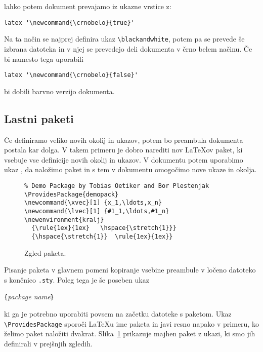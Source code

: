 lahko potem dokument prevajamo iz ukazne vrstice z:
\begin{verbatim}
latex '\newcommand{\crnobelo}{true}'
\end{verbatim}

Na ta način se najprej definira ukaz \verb|\blackandwhite|, potem pa 
se prevede še izbrana datoteka in v njej se prevedejo deli dokumenta v
črno belem načinu. Če bi namesto tega uporabili 
\begin{verbatim}
latex '\newcommand{\crnobelo}{false}'
\end{verbatim}
bi dobili barvno verzijo dokumenta.

\subsection{Lastni paketi}

Če definiramo veliko novih okolij in ukazov, potem bo preambula dokumenta 
postala kar dolga. V takem primeru je dobro narediti  nov 
\LaTeX{}ov paket, ki vsebuje vse definicije novih okolij in ukazov. 
V dokumentu potem uporabimo ukaz , da naložimo paket in
s tem v dokumentu omogočimo nove ukaze in okolja.
\begin{figure}[!htbp]
\begin{lined}{\textwidth}
\begin{verbatim}
% Demo Package by Tobias Oetiker and Bor Plestenjak
\ProvidesPackage{demopack}
\newcommand{\xvec}[1] {x_1,\ldots,x_n}
\newcommand{\lvec}[1] {#1_1,\ldots,#1_n}
\newenvironment{kralj}
  {\rule{1ex}{1ex}   \hspace{\stretch{1}}}
  {\hspace{\stretch{1}}  \rule{1ex}{1ex}}
\end{verbatim}
\end{lined}
\caption{Zgled paketa.} \label{package}
\end{figure}

Pisanje paketa v glavnem pomeni kopiranje vsebine preambule v ločeno datoteko 
s končnico \texttt{.sty}. Poleg tega je še poseben ukaz 
\begin{lscommand}
\verb|{|\emph{package name}\verb|}|
\end{lscommand}
\noindent ki ga je potrebno uporabiti povsem na začetku datoteke s paketom. 
Ukaz \verb|\ProvidesPackage| sporoči \LaTeX{}u ime paketa in javi resno 
napako v primeru, ko želimo paket naložiti dvakrat. Slika~\ref{package}
prikazuje majhen paket z ukazi, ki smo jih definirali v prejšnjih zgledih.


